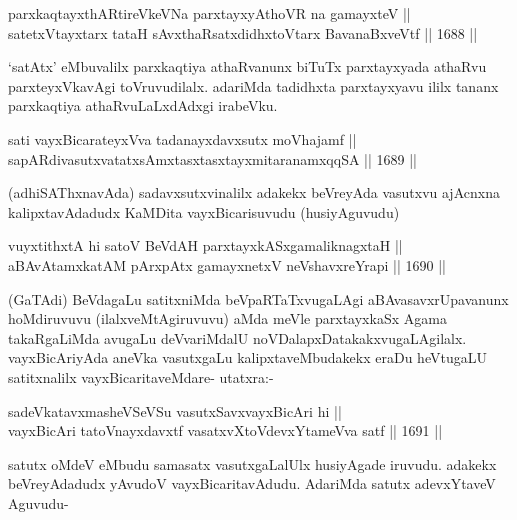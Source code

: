 \begin{shl}
parxkaqtayxthARtireVkeVNa parxtayxyAthoVR na gamayxteV || \\
satetxVtayxtarx tataH sAvxthaRsatxdidhxtoV\s tarx BavanaBxveVtf \hfill || 1688 ||  
\end{shl}

\begin{artha}
`satAtx' eMbuvalilx parxkaqtiya athaRvanunx biTuTx parxtayxyada athaRvu parxteyxVkavAgi toVruvudilalx. adariMda tadidhxta parxtayxyavu ililx tananx parxkaqtiya athaRvuLaLxdAdxgi irabeVku.
\end{artha}

\begin{shl}
sati vayxBicarateyxVva tadanayxdavxsutx moVhajamf || \\
sapARdivasutxvatatxsAmxtasxtasxtayxmitaranamxqqSA \hfill || 1689 ||  
\end{shl}

\begin{artha}
(adhiSAThxnavAda) sadavxsutxvinalilx adakekx beVreyAda vasutxvu ajAcnxna kalipxtavAdadudx KaMDita vayxBicarisuvudu (husiyAguvudu)
\end{artha}

\begin{shl}
vuyxtithxtA hi satoV BeVdAH parxtayxkASxgamaliknagxtaH ||  \\
aBAvAtamxkatAM pArxpAtx gamayxnetxV neVshavxreYrapi \hfill || 1690 ||  
\end{shl}

\begin{artha}
(GaTAdi) BeVdagaLu satitxniMda beVpaRTaTxvugaLAgi aBAvasavxrUpavanunx hoMdiruvuvu (ilalxveMtAgiruvuvu) aMda meVle parxtayxkaSx Agama takaRgaLiMda avugaLu deVvariMdalU noVDalapxDatakakxvugaLAgilalx. vayxBicAriyAda aneVka vasutxgaLu kalipxtaveMbudakekx eraDu heVtugaLU satitxnalilx vayxBicaritaveMdare- utatxra:-
\end{artha}

\begin{shl}
sadeVkatavxmasheVSeVSu vasutxSavxvayxBicAri hi ||  \\
vayxBicAri tatoVnayxdavxtf vasatxvXtoV\s devxYtameVva satf \hfill || 1691 ||  
\end{shl}

\begin{artha}
satutx oMdeV eMbudu samasatx vasutxgaLalUlx husiyAgade iruvudu. adakekx beVreyAdadudx yAvudoV vayxBicaritavAdudu. AdariMda satutx adevxYtaveV Aguvudu-
\end{artha}

